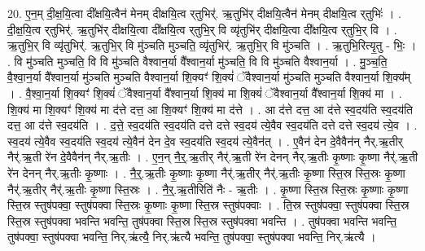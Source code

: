 \documentclass[17pt]{extarticle}
\begin{document}
20. ए॒न॒म् दी॒क्ष॒यि॒त्वा दी᳚क्षयि॒त्वैन॑ मेनम् दीक्षयि॒त्व र्‌तुभिर्॑. ऋ॒तुभि॑र् दीक्षयि॒त्वैन॑ मेनम् दीक्षयि॒त्व र्‌तुभिः॑ । . दी॒क्ष॒यि॒त्व र्‌तुभिर्॑. ऋ॒तुभि॑र् दीक्षयि॒त्वा दी᳚क्षयि॒त्व र्‌तुभि॒र् वि व्यृ॑तुभि॑र् दीक्षयि॒त्वा दी᳚क्षयि॒त्व र्‌तुभि॒र् वि । . ऋ॒तुभि॒र् वि व्यृ॑तुभिर्॑. ऋ॒तुभि॒र् वि मु॑ञ्चति मुञ्चति॒ व्यृ॑तुभिर्॑. ऋ॒तुभि॒र् वि मु॑ञ्चति । . ऋ॒तुभि॒रित्यृ॒तु - भिः॒ । . वि मु॑ञ्चति मुञ्चति॒ वि वि मु॑ञ्चति वैश्वान॒र्या वै᳚श्वान॒र्या मु॑ञ्चति॒ वि वि मु॑ञ्चति वैश्वान॒र्या । . मु॒ञ्च॒ति॒ वै॒श्वा॒न॒र्या वै᳚श्वान॒र्या मु॑ञ्चति मुञ्चति वैश्वान॒र्या शि॒क्यꣳ॑ शि॒क्यं॑ ॅवैश्वान॒र्या मु॑ञ्चति मुञ्चति वैश्वान॒र्या शि॒क्य᳚म् । . वै॒श्वा॒न॒र्या शि॒क्यꣳ॑ शि॒क्यं॑ ॅवैश्वान॒र्या वै᳚श्वान॒र्या शि॒क्य॑ मा शि॒क्यं॑ ॅवैश्वान॒र्या वै᳚श्वान॒र्या शि॒क्य॑ मा । . शि॒क्य॑ मा शि॒क्यꣳ॑ शि॒क्य॑ मा द॑त्ते दत्त॒ आ शि॒क्यꣳ॑ शि॒क्य॑ मा द॑त्ते । . आ द॑त्ते दत्त॒ आ द॑त्ते स्व॒दय॑ति स्व॒दय॑ति दत्त॒ आ द॑त्ते स्व॒दय॑ति । . द॒त्ते॒ स्व॒दय॑ति स्व॒दय॑ति दत्ते दत्ते स्व॒दय॑ त्ये॒वैव स्व॒दय॑ति दत्ते दत्ते स्व॒दय॑ त्ये॒व । . स्व॒दय॑ त्ये॒वैव स्व॒दय॑ति स्व॒दय॑ त्ये॒वैन॑ देन दे॒व स्व॒दय॑ति स्व॒दय॑ त्ये॒वैन॑त् । . ए॒वैन॑ देन दे॒वैवैन॑न् नैर्.ऋ॒तीर् नैर्॑.ऋ॒ती रे॑न दे॒वैवैन॑न् नैर्.ऋ॒तीः । . ए॒न॒न् नै॒र्॒.ऋ॒तीर् नैर्॑.ऋ॒ती रे॑न देनन् नैर्.ऋ॒तीः कृ॒ष्णाः कृ॒ष्णा नैर्॑.ऋ॒ती रे॑न देनन् नैर्.ऋ॒तीः कृ॒ष्णाः । . नै॒र्॒.ऋ॒तीः कृ॒ष्णाः कृ॒ष्णा नैर्॑.ऋ॒तीर् नैर्॑.ऋ॒तीः कृ॒ष्णा स्ति॒स्र स्ति॒स्रः कृ॒ष्णा नैर्॑.ऋ॒तीर् नैर्॑.ऋ॒तीः कृ॒ष्णा स्ति॒स्रः । . नै॒र्॒.ऋ॒तीरिति॑ नैः - ऋ॒तीः । . कृ॒ष्णा स्ति॒स्र स्ति॒स्रः कृ॒ष्णाः कृ॒ष्णा स्ति॒स्र स्तुष॑पक्वा॒ स्तुष॑पक्वा स्ति॒स्रः कृ॒ष्णाः कृ॒ष्णा स्ति॒स्र स्तुष॑पक्वाः । . ति॒स्र स्तुष॑पक्वा॒ स्तुष॑पक्वा स्ति॒स्र स्ति॒स्र स्तुष॑पक्वा भवन्ति भवन्ति॒ तुष॑पक्वा स्ति॒स्र स्ति॒स्र स्तुष॑पक्वा भवन्ति । . तुष॑पक्वा भवन्ति भवन्ति॒ तुष॑पक्वा॒ स्तुष॑पक्वा भवन्ति॒ निर्.ऋ॑त्यै॒ निर्.ऋ॑त्यै भवन्ति॒ तुष॑पक्वा॒ स्तुष॑पक्वा भवन्ति॒ निर्.ऋ॑त्यै । \newline
\end{document}
